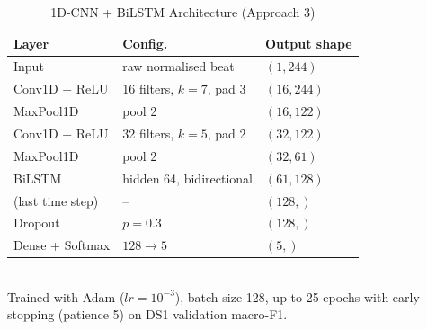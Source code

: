 \begin{table}[t]
\caption{1D-CNN + BiLSTM Architecture (Approach 3)}
\label{tab:cnn}
\centering
\begin{tabular}{lll}
\toprule
\textbf{Layer} & \textbf{Config.} & \textbf{Output shape} \\
\midrule
Input & raw normalised beat & $(1, 244)$ \\
Conv1D + ReLU & 16 filters, $k{=}7$, pad 3 & $(16, 244)$ \\
MaxPool1D & pool 2 & $(16, 122)$ \\
Conv1D + ReLU & 32 filters, $k{=}5$, pad 2 & $(32, 122)$ \\
MaxPool1D & pool 2 & $(32, 61)$ \\
BiLSTM & hidden 64, bidirectional & $(61, 128)$ \\
(last time step) & -- & $(128,)$ \\
Dropout & $p{=}0.3$ & $(128,)$ \\
Dense + Softmax & $128 \rightarrow 5$ & $(5,)$ \\
\bottomrule
\end{tabular}
\\[4pt]
\footnotesize Trained with Adam ($lr{=}10^{-3}$), batch size 128, up to 25
epochs with early stopping (patience 5) on DS1 validation macro-F1.
\end{table}
